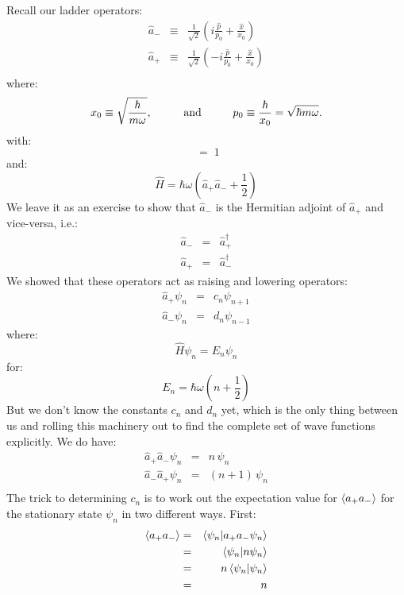 \documentclass[12pt]{book}
\begin{document}
Recall our ladder operators:
\begin{eqnarray*}
\hat{a}_- &\equiv& \frac{1}{\sqrt{2}}\left(i \frac{\hat{p}}{p_0} + \frac{\hat{x}}{x_0}\right) \\
\hat{a}_+ &\equiv& \frac{1}{\sqrt{2}}\left(-i \frac{\hat{p}}{p_0} + \frac{\hat{x}}{x_0} \right) \\
\end{eqnarray*}
where:
$$x_0 \equiv \sqrt{\frac{\hbar}{m \omega}}, \hspace{1cm} {\rm and} \hspace{1cm} p_0 \equiv \frac{\hbar}{x_0} = \sqrt{\hbar m \omega}.$$
with:
\begin{equation*}
[\hat{a}_-, \hat{a}_+] \; = \;  1
\end{equation*}
and:
\begin{equation*}
\hat{H} =  \hbar\omega \left( \hat{a}_+ \hat{a}_- + \frac{1}{2} \right)
\end{equation*}
We leave it as an exercise to show that $\hat{a}_-$ is the Hermitian adjoint of $\hat{a}_+$ and vice-versa, i.e.:
\begin{eqnarray*}
\hat{a}_- &=& \hat{a}_+^\dagger\\
\hat{a}_+ &=& \hat{a}_-^\dagger
\end{eqnarray*}
We showed that these operators act as raising and lowering operators:
\begin{eqnarray*}
\hat{a}_+ \psi_n &=& c_n \psi_{n+1} \\
\hat{a}_- \psi_n &=& d_n \psi_{n-1} 
\end{eqnarray*}
where:
$$\hat{H}\psi_n = E_n \psi_n$$
for:
$$E_n = \hbar \omega \left(n + \frac{1}{2}\right)$$
But we don't know the constants $c_n$ and $d_n$ yet, which is the only thing between us and rolling this machinery out to find the complete set of wave functions explicitly.
We do have:
\begin{eqnarray*}
\hat{a}_+\hat{a}_- \psi_n &=& n \, \psi_{n} \\
\hat{a}_-\hat{a}_+ \psi_n &=& (n+1) \, \psi_{n} \\
\end{eqnarray*}
The trick to determining $c_n$ is to work out the expectation value for $\braket{a_+a_-}$ 
for the stationary state $\psi_n$ in two different ways.  First:
\begin{eqnarray*}
\braket{a_+a_-} &=& \braket{\psi_n | a_+ a_- \psi_n}\\
 &=& \braket{\psi_n | n \psi_n}\\
 &=& n \braket{\psi_n | \psi_n}\\
 &=& n \\
\end{eqnarray*}
\end{document}

